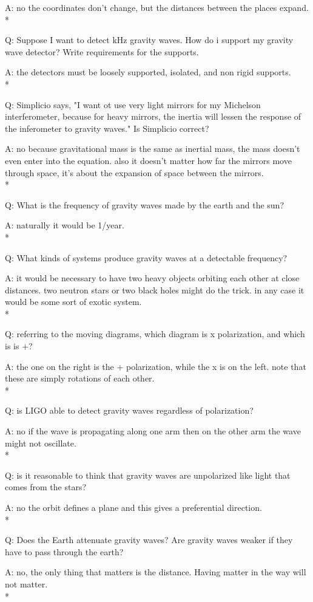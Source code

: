 \documentclass{article}
\begin{document}
A: no the coordinates don't change, but the distances between the places expand. 
\\*

Q: Suppose I want to detect kHz gravity waves. How do i support my gravity wave detector? Write requirements for the supports.

A: the detectors must be loosely supported, isolated, and non rigid supports. 
\\*

Q: Simplicio says, "I want ot use very light mirrors for my Michelson interferometer, because for heavy mirrors, the inertia will lessen the response of the inferometer to gravity waves." Is Simplicio correct? 

A: no because gravitational mass is the same as inertial mass, the mass doesn't even enter into the equation. also it doesn't matter how far the mirrors move through space, it's about the expansion of space between the mirrors. 
\\*

Q: What is the frequency of gravity waves made by the earth and the sun?

A: naturally it would be 1/year.
\\*

Q: What kinds of systems produce gravity waves at a detectable frequency? 

A: it would be necessary to have two heavy objects orbiting each other at close distances. two neutron stars or two black holes might do the trick. in any case it would be some sort of exotic system. 
\\*

Q: referring to the moving diagrams, which diagram is x polarization, and which is is +?

A: the one on the right is the + polarization, while the x is on the left. note that these are simply rotations of each other. 
\\*

Q: is LIGO able to detect gravity waves regardless of polarization? 

A: no if the wave is propagating along one arm then on the other arm the wave might not oscillate. 
\\*

Q: is it reasonable to think that gravity waves are unpolarized like light that comes from the stars?

A: no the orbit defines a plane and this gives a preferential direction. 
\\*

Q: Does the Earth attenuate gravity waves? Are gravity waves weaker if they have to pass through the earth? 

A: no, the only thing that matters is the distance. Having matter in the way will not matter. 
\\* 
\end{document}
